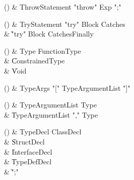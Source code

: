 \begin{bbgrammarappendix}

() & ThrowStatement \label{prod:ThrowStatement}  \: \xcd"throw" Exp \xcd";"  \\


\end{bbgrammarappendix}

\begin{bbgrammarappendix}

() & TryStatement \label{prod:TryStatement}  \: \xcd"try" Block Catches  \\

 &    \| \xcd"try" Block Catches\opt Finally \\

\end{bbgrammarappendix}

\begin{bbgrammarappendix}

() & Type \label{prod:Type}  \: FunctionType  \\

 &    \| ConstrainedType \\
 &    \| Void \\

\end{bbgrammarappendix}

\begin{bbgrammarappendix}

() & TypeArgs \label{prod:TypeArgs}  \: \xcd"[" TypeArgumentList \xcd"]"  \\


\end{bbgrammarappendix}

\begin{bbgrammarappendix}

() & TypeArgumentList \label{prod:TypeArgumentList}  \: Type  \\

 &    \| TypeArgumentList \xcd"," Type \\

\end{bbgrammarappendix}

\begin{bbgrammarappendix}

() & TypeDecl \label{prod:TypeDecl}  \: ClassDecl  \\

 &    \| StructDecl \\
 &    \| InterfaceDecl \\
 &    \| TypeDefDecl \\
 &    \| \xcd";" \\

\end{bbgrammarappendix}

